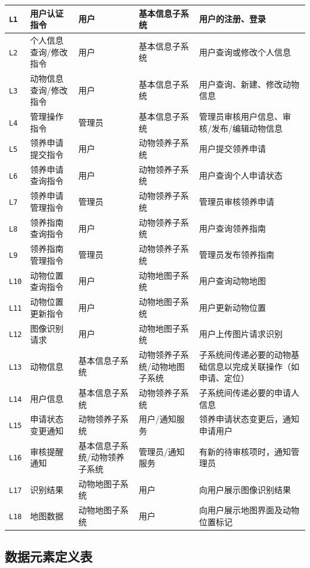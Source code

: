 \documentclass[12pt,a4paper,UTF8]{article}
\begin{document}
\begin{xltabular}{\linewidth}{
  |>{\centering\arraybackslash}m{1cm}
  |>{\centering\arraybackslash}m{3.5cm}
  |>{\centering\arraybackslash}m{3cm}
  |>{\centering\arraybackslash}m{3cm}
  |>{\centering\arraybackslash}m{5cm}|}
  \verb|L1| & 用户认证指令 & 用户 & 基本信息子系统 & 用户的注册、登录 \\ \hline
  \verb|L2| & 个人信息查询/修改指令 & 用户 & 基本信息子系统 & 用户查询或修改个人信息 \\ \hline
  \verb|L3| & 动物信息查询/修改指令 & 用户 & 基本信息子系统 & 用户查询、新建、修改动物信息 \\ \hline
  \verb|L4| & 管理操作指令 & 管理员 & 基本信息子系统 & 管理员审核用户信息、审核/发布/编辑动物信息 \\ \hline
  \verb|L5| & 领养申请提交指令 & 用户& 动物领养子系统 & 用户提交领养申请 \\ \hline
  \verb|L6| & 领养申请查询指令 & 用户 & 动物领养子系统 & 用户查询个人申请状态 \\ \hline
  \verb|L7| & 领养申请管理指令 & 管理员 & 动物领养子系统 & 管理员审核领养申请 \\ \hline
  \verb|L8| & 领养指南查询指令 & 用户 & 动物领养子系统 & 用户查询领养指南 \\ \hline
  \verb|L9| & 领养指南管理指令 & 管理员 & 动物领养子系统 & 管理员发布领养指南 \\ \hline
  \verb|L10| & 动物位置查询指令 & 用户 & 动物地图子系统 & 用户查询动物地图 \\ \hline
  \verb|L11| & 动物位置更新指令 & 用户 & 动物地图子系统 & 用户更新动物位置 \\ \hline
  \verb|L12| & 图像识别请求 & 用户 & 动物地图子系统 & 用户上传图片请求识别 \\ \hline
  \verb|L13| & 动物信息 & 基本信息子系统 & 动物领养子系统/动物地图子系统 & 子系统间传递必要的动物基础信息以完成关联操作（如申请、定位） \\ \hline
  \verb|L14| & 用户信息 & 基本信息子系统 & 动物领养子系统 & 子系统间传递必要的申请人信息 \\ \hline
  \verb|L15| & 申请状态变更通知 & 动物领养子系统 & 用户/通知服务 & 领养申请状态变更后，通知申请用户 \\ \hline
  \verb|L16| & 审核提醒通知 & 基本信息子系统/动物领养子系统 & 管理员/通知服务 & 有新的待审核项时，通知管理员 \\ \hline
  \verb|L17| & 识别结果 & 动物地图子系统 & 用户& 向用户展示图像识别结果 \\ \hline
  \verb|L18| & 地图数据 & 动物地图子系统 & 用户& 向用户展示地图界面及动物位置标记 \\ \hline
\end{xltabular}


\subsection{数据元素定义表}
\end{document}
